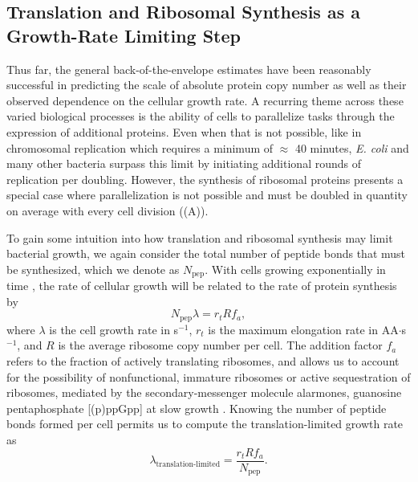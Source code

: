 
\subsection{Translation and Ribosomal Synthesis as a Growth-Rate Limiting Step}
Thus far, the general back-of-the-envelope estimates have been reasonably
successful in predicting the scale of absolute protein copy number as well as
their observed dependence on the cellular growth rate. A recurring theme
across these varied biological processes is the ability of cells to  parallelize
tasks through the expression of additional proteins.  Even when that is not
possible, like in chromosomal replication which  requires a minimum of $\approx$
40 minutes, \textit{E. coli} and many other bacteria surpass this limit by
initiating additional rounds of replication per doubling.
However, the synthesis of ribosomal proteins
presents a special case where parallelization is not possible and must be
doubled in quantity on average with every cell division
((A)).

To gain some intuition into how translation and ribosomal synthesis may limit
bacterial growth, we again consider the total number of peptide bonds that must
be synthesized, which we denote as $N_\text{pep}$. With cells growing exponentially in time
\citep{godin2010}, the rate of cellular growth will be related to the rate of protein synthesis by
\begin{equation}
    N_\text{pep} \lambda = r_t R f_a,
    \label{eq:mass_balance}
\end{equation}
where $\lambda$ is the cell growth rate in s$^{-1}$, $r_t$ is the maximum
elongation rate in AA$\cdot$s$^{-1}$, and $R$ is the average ribosome copy
number per cell. The addition factor $f_a$ refers to the fraction of actively
translating ribosomes, and allows us to account for the possibility of
nonfunctional, immature ribosomes or active sequestration of ribosomes, mediated
by the secondary-messenger molecule alarmones, guanosine pentaphosphate
[(p)ppGpp] at slow growth \citep{dennis2004, dai2016}. Knowing the number of
peptide bonds formed per cell permits us to compute the translation-limited growth
rate as
\begin{equation}
\lambda_\text{translation-limited} = \frac{r_t R f_a}{N_\text{pep}}.
\label{eq:lambda_limit}
\end{equation}

